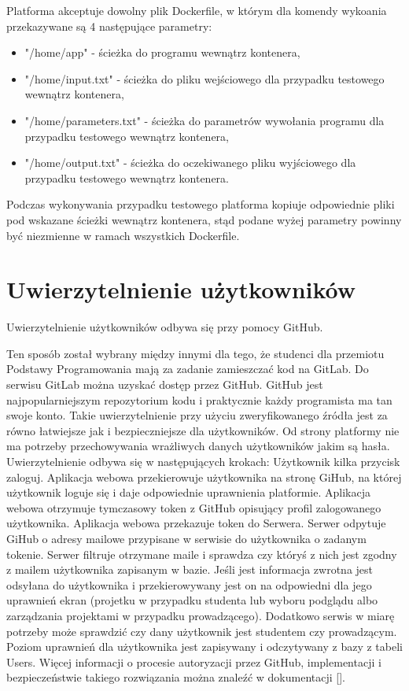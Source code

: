 Platforma akceptuje dowolny plik Dockerfile, w którym dla komendy wykoania przekazywane są 4 następujące parametry:
\begin{itemize}
    \item "/home/app" - ścieżka do programu wewnątrz kontenera,
    \item "/home/input.txt" - ścieżka do pliku wejściowego dla przypadku testowego wewnątrz kontenera,
    \item "/home/parameters.txt" - ścieżka do parametrów wywołania programu dla przypadku testowego wewnątrz kontenera,
    \item "/home/output.txt" - ścieżka do oczekiwanego pliku wyjściowego dla przypadku testowego wewnątrz kontenera.
\end{itemize}

Podczas wykonywania przypadku testowego platforma kopiuje odpowiednie pliki pod wskazane ścieżki wewnątrz kontenera, stąd podane wyżej parametry powinny być niezmienne w ramach wszystkich Dockerfile.


\section {Uwierzytelnienie użytkowników}
\label{authorization}

Uwierzytelnienie użytkowników odbywa się przy pomocy GitHub.

Ten sposób został wybrany między innymi dla tego, że studenci dla przemiotu Podstawy Programowania mają za zadanie zamieszczać kod na GitLab.
Do serwisu GitLab można uzyskać dostęp przez GitHub.
GitHub jest najpopularniejszym repozytorium kodu i praktycznie każdy programista ma tan swoje konto.
Takie uwierzytelnienie przy użyciu zweryfikowanego źródła jest za równo łatwiejsze jak i bezpieczniejsze dla użytkowników.
Od strony platformy nie ma potrzeby przechowywania wrażliwych danych użytkowników jakim są hasła.
Uwierzytelnienie odbywa się w następujących krokach:
Użytkownik kilka przycisk zaloguj.
Aplikacja webowa przekierowuje użytkownika na stronę GiHub, na której użytkownik loguje się i daje odpowiednie uprawnienia platformie.
Aplikacja webowa otrzymuje tymczasowy token z GitHub opisujący profil zalogowanego użytkownika.
Aplikacja webowa przekazuje token do Serwera.
Serwer odpytuje GiHub o adresy mailowe przypisane w serwisie do użytkownika o zadanym tokenie.
Serwer filtruje otrzymane maile i sprawdza czy któryś z nich jest zgodny z mailem użytkownika zapisanym w bazie.
Jeśli jest informacja zwrotna jest odsyłana do użytkownika i przekierowywany jest on na odpowiedni dla jego uprawnień ekran (projetku w przypadku studenta lub wyboru podglądu albo zarządzania projektami w przypadku prowadzącego).
Dodatkowo serwis w miarę potrzeby może sprawdzić czy dany użytkownik jest studentem czy prowadzącym.
Poziom uprawnień dla użytkownika jest zapisywany i odczytywany z bazy z tabeli Users.
Więcej informacji o procesie autoryzacji przez GitHub, implementacji i bezpieczeństwie takiego rozwiązania można znaleźć w dokumentacji [].


